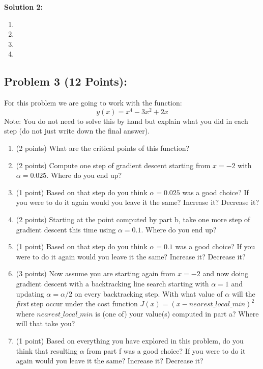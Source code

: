 \documentclass[]{article}
\begin{document}
\textbf{Solution 2:}
\begin{enumerate}[label=(\alph*)]
    \item %
          
    \item %
        
    \item %
    
    \item %
    
\end{enumerate}

\clearpage
\subsection*{Problem 3 (12 Points):}
For this problem we are going to work with the function:
$$y(x) = x^4 - 3x^2 + 2x$$
Note: You do not need to solve this by hand but explain what you did in each step (do not just write down the final answer).
\begin{enumerate}[label=(\alph*)]
    \item (2 points) What are the critical points of this function?
    \item (2 points) Compute one step of gradient descent starting from $x=-2$ with $\alpha = 0.025$. Where do you end up?
    \item (1 point) Based on that step do you think $\alpha = 0.025$ was a good choice? If you were to do it again would you leave it the same? Increase it? Decrease it?
    \item (2 points) Starting at the point computed by part b, take one more step of gradient descent this time using $\alpha = 0.1$. Where do you end up?
    \item (1 point) Based on that step do you think $\alpha = 0.1$ was a good choice? If you were to do it again would you leave it the same? Increase it? Decrease it?
    \item (3 points) Now assume you are starting again from $x=-2$ and now doing gradient descent with a backtracking line search starting with $\alpha = 1$ and updating $\alpha = \alpha / 2$ on every backtracking step. With what value of $\alpha$ will the \textit{first} step occur under the cost function $J(x) = (x - nearest\_local\_min)^2$ where $nearest\_local\_min$ is (one of) your value(s) computed in part a? Where will that take you?
    \item (1 point) Based on everything you have explored in this problem, do you think that resulting $\alpha$ from part f was a good choice? If you were to do it again would you leave it the same? Increase it? Decrease it?
\end{enumerate}
\end{document}
